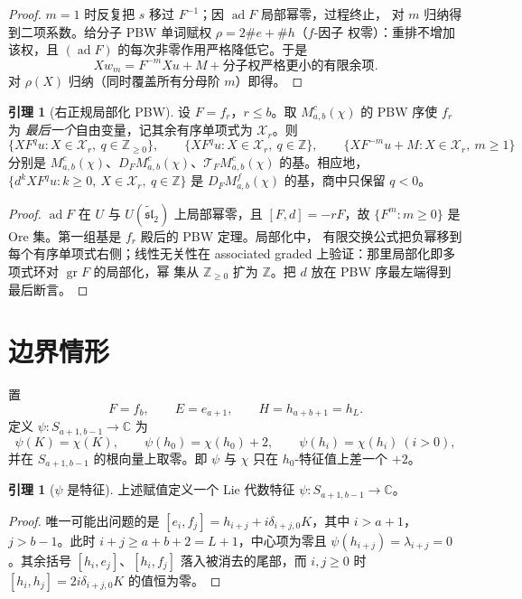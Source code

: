 \documentclass[UTF8,11pt]{ctexart}
\newcommand{\C}{\mathbb C}
\newcommand{\Z}{\mathbb Z}
\newcommand{\slt}{\widetilde{\mathfrak{sl}}_2}
\newcommand{\ad}{\operatorname{ad}}
\newcommand{\X}{\mathcal X}
\newcommand{\T}{\mathcal T}
\theoremstyle{definition}
\newtheorem{lemma}[proposition]{引理}
\begin{document}
\begin{proof}
\(m=1\) 时反复把 \(s\) 移过 \(F^{-1}\)；因 \(\ad F\) 局部幂零，过程终止，
对 \(m\) 归纳得到二项系数。给分子 PBW 单词赋权 \(\rho=2\#e+\#h\)（\(f\)-因子
权零）：重排不增加该权，且 \((\ad F)\) 的每次非零作用严格降低它。于是
\[
Xw_m=F^{-m}Xu+M+\text{分子权严格更小的有限余项}.
\]
对 \(\rho(X)\) 归纳（同时覆盖所有分母阶 \(m\)）即得。
\end{proof}

\begin{lemma}[右正规局部化 PBW]\label{lem:right-pbw}
设 \(F=f_r\)，\(r\le b\)。取 \(M^c_{a,b}(\chi)\) 的 PBW 序使 \(f_r\) 为
\emph{最后一个}自由变量，记其余有序单项式为 \(\X_r\)。则
\[
\{XF^qu:X\in\X_r,\ q\in\Z_{\ge0}\},\qquad
\{XF^qu:X\in\X_r,\ q\in\Z\},\qquad
\{XF^{-m}u+M:X\in\X_r,\ m\ge1\}
\]
分别是 \(M^c_{a,b}(\chi)\)、\(D_FM^c_{a,b}(\chi)\)、\(\T_FM^c_{a,b}(\chi)\)
的基。相应地，\(\{d^kXF^qu:k\ge0,\ X\in\X_r,\ q\in\Z\}\) 是
\(D_FM^f_{a,b}(\chi)\) 的基，商中只保留 \(q<0\)。
\end{lemma}

\begin{proof}
\(\ad F\) 在 \(U\) 与 \(U(\slt)\) 上局部幂零，且 \([F,d]=-rF\)，故
\(\{F^m:m\ge0\}\) 是 Ore 集。第一组基是 \(f_r\) 殿后的 PBW 定理。局部化中，
有限交换公式把负幂移到每个有序单项式右侧；线性无关性在 associated
graded 上验证：那里局部化即多项式环对 \(\operatorname{gr}F\) 的局部化，幂
集从 \(\Z_{\ge0}\) 扩为 \(\Z\)。把 \(d\) 放在 PBW 序最左端得到最后断言。
\end{proof}

\section{边界情形}\label{sec:boundary}

置
\[
F=f_b,\qquad E=e_{a+1},\qquad H=h_{a+b+1}=h_L.
\]
定义 \(\psi:S_{a+1,b-1}\to\C\) 为
\[
\psi(K)=\chi(K),\qquad
\psi(h_0)=\chi(h_0)+2,\qquad
\psi(h_i)=\chi(h_i)\ (i>0),
\]
并在 \(S_{a+1,b-1}\) 的根向量上取零。即 \(\psi\) 与 \(\chi\) 只在
\(h_0\)-特征值上差一个 \(+2\)。

\begin{lemma}[\(\psi\) 是特征]\label{lem:char}
上述赋值定义一个 Lie 代数特征 \(\psi:S_{a+1,b-1}\to\C\)。
\end{lemma}

\begin{proof}
唯一可能出问题的是 \([e_i,f_j]=h_{i+j}+i\delta_{i+j,0}K\)，其中
\(i>a+1\)，\(j>b-1\)。此时 \(i+j\ge a+b+2=L+1\)，中心项为零且
\(\psi(h_{i+j})=\lambda_{i+j}=0\)。其余括号 \([h_i,e_j]\)、\([h_i,f_j]\)
落入被消去的尾部，而 \(i,j\ge0\) 时
\([h_i,h_j]=2i\delta_{i+j,0}K\) 的值恒为零。
\end{proof}
\end{document}
